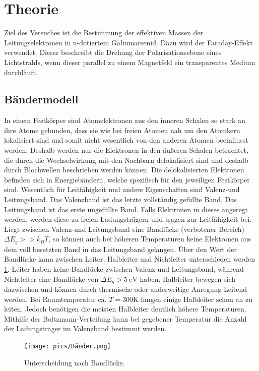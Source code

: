 \section{Theorie}
\label{sec:Theorie}
Ziel des Versuches ist die Bestimmung der effektiven Massen der Leitungselektronen in n-dotiertem Galiumarsenid.
Dazu wird der Faraday-Effekt verwendet. Dieser beschreibt die Drehung der Polarisationsebene eines Lichtstrahls, wenn dieser parallel zu einem Magnetfeld
ein transparentes Medium durchläuft.

\subsection{Bändermodell}
In einem Festkörper sind
Atomelektronen aus den inneren Schalen so stark an ihre Atome gebunden, dass sie wie bei freien Atomen nah um den Atomkern lokalisiert sind
und somit nicht wesentlich von den anderen Atomen beeinflusst werden. Deshalb werden nur die Elektronen in den äußeren Schalen betrachtet,
die durch die Wechselwirkung mit den Nachbarn delokalisiert sind und deshalb durch Blochwellen beschrieben werden können.
Die delokalisierten Elektronen befinden sich in Energiebändern, welche spezifisch für den jeweiligen Festkörper sind.
Wesentlich für Leitfähigkeit und andere Eigenschaften sind Valenz-und Leitungsband. Das Valenzband ist das letzte vollständig gefüllte Band.
Das Leitungsband ist das erste ungefüllte Band. Falls Elektronen in dieses angeregt werden, werden diese zu freien Ladungsträgern und tragen zur Leitfähigkeit bei.
Liegt zwischen Valenz-und Leitungsband eine Bandlücke (verbotener Bereich) $\Delta E_g >> k_B T$, so können auch bei höheren Temperaturen keine
Elektronen aus dem voll besetzten Band in das Leitungsband gelangen. Über den Wert der Bandlücke kann zwischen Leiter, Halbleiter und Nichtleiter
unterschieden werden \ref{pic:bander}. Leiter haben keine Bandlücke zwischen Valenz-und Leitungsband, während Nichtleiter eine Bandlücke von $\Delta E_g > \SI{5}{\eV}$ haben.
Halbleiter bewegen sich dazwischen und können durch thermische oder anderweitige Anregung Leitend werden. Bei Raumtemperatur ca. $T = 300 \si{\kelvin}$ fangen einige Halbleiter schon an zu leiten.
Jedoch benötigen die meisten Halbleiter deutlich höhere Temperaturen. Mithilfe der Boltzmann-Verteilung kann bei gegebener Temperatur die Anzahl der Ladungsträger im Valenzband bestimmt werden.
\begin{figure}
    \centering
    \texttt{[image: pics/Bänder.png]}
    \caption{Unterscheidung nach Bandlücke.\cite{wikipedia}}
    \label{pic:bander}
\end{figure}


